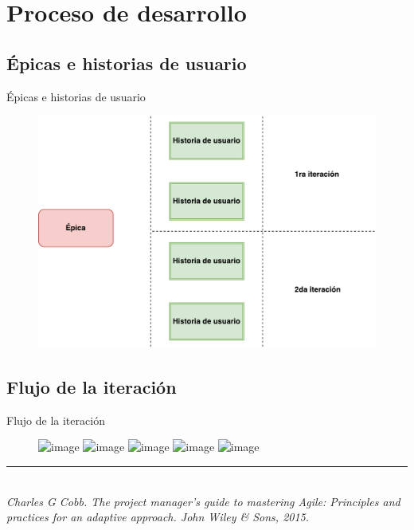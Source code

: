 \documentclass[10pt,xcolor=table]{beamer}
\newcommand{\decoRule}{\rule{\textwidth}{.4pt}} %
\begin{document}
\section{Proceso de desarrollo}
\subsection{Épicas e historias de usuario}
\begin{frame}{Épicas e historias de usuario}
	\begin{figure}
		\centering
	    \includegraphics[scale=0.5]{../Figuras/epic_diagram}
	\end{figure}
\end{frame}

\subsection{Flujo de la iteración}
\begin{frame}{Flujo de la iteración}
	\begin{figure}
		\centering
		\includegraphics<1>[scale=0.235]{../Figuras/flujo_scrum_1}
		\includegraphics<2>[scale=0.235]{../Figuras/flujo_scrum_2}
		\includegraphics<3>[scale=0.235]{../Figuras/flujo_scrum_3}
		\includegraphics<4>[scale=0.235]{../Figuras/flujo_scrum_4}
		\includegraphics<5>[scale=0.235]{../Figuras/flujo_scrum_5}
	\end{figure}
	\decoRule \\
  	\tiny \textit{Charles G Cobb. The project manager’s guide to mastering Agile: Principles and practices for an adaptive approach. John Wiley \& Sons, 2015.} \\
\end{frame}
\end{document}
